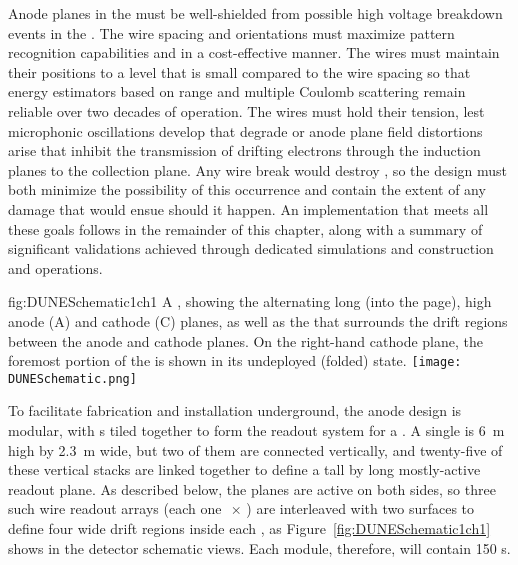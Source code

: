 Anode planes in the  must be well-shielded from possible high voltage breakdown events in the .  The  wire spacing and orientations must maximize pattern recognition capabilities and  in a cost-effective manner.  The  wires must maintain their positions to a level that is small compared to the wire spacing so that energy estimators based on range and multiple Coulomb scattering remain reliable over two decades of operation.  The wires must hold their tension, lest microphonic oscillations develop that degrade  or anode plane field distortions arise that inhibit the transmission of drifting electrons through the induction planes to the collection plane.  Any wire break would destroy , so the  design must both minimize the possibility of this occurrence and contain the extent of any damage that would ensue should it happen.  An  implementation that meets all these goals follows in the remainder of this chapter, along with a summary of significant validations achieved through dedicated simulations and  construction and operations.


\begin{dunefigure}{fig:DUNESchematic1ch1}
{A \nominalmodsize {}  , showing the alternating \sptpclen{} long (into the page), \tpcheight{} high anode (A) and cathode (C) planes, as well as the  that surrounds the drift regions between the anode and cathode planes. On the right-hand cathode plane, the foremost portion of the  is shown in its undeployed (folded) state.}
\texttt{[image: DUNESchematic.png]}
\end{dunefigure}

To facilitate fabrication and installation underground, the anode design is modular, with s tiled together to form the readout system for a \nominalmodsize {}. A single  is \SI{6}{m} high by \SI{2.3}{m} wide, but two of them are connected vertically, and twenty-five of these vertical stacks are linked together to define a \tpcheight %
tall by \sptpclen %
long mostly-active readout plane.  As described below, the planes are active on both sides, so three such wire readout arrays (each one \tpcheight$\,\times\,$\sptpclen) %
are interleaved with two  surfaces to define four \spmaxdrift %
wide drift regions inside each , as Figure~\ref{fig:DUNESchematic1ch1} shows in the detector schematic views. Each  \nominalmodsize module, therefore, will contain 150 s.

